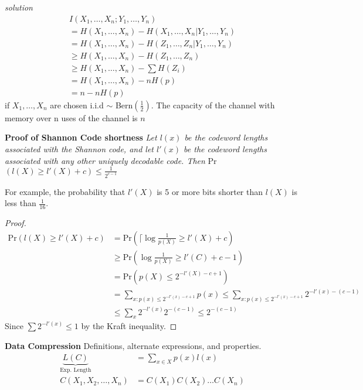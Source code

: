 \documentclass[10pt]{article}
\begin{document}
\begin{tiny}
\begin{multicols}{3}
{\it solution} 
\begin{eqnarray*}
I(X_{1},\ldots,X_{n};Y_{1},\ldots,Y_{n})\\
= H(X_{1},\ldots,X_{n})-H(X_{1},\ldots,X_{n}|Y_{1},\ldots,Y_{n})\\
= H(X_{1},\ldots,X_{n}) - H(Z_{1},\ldots,Z_{n}|Y_{1},\ldots,Y_{n})\\
\geq H(X_{1},\ldots,X_{n}) - H(Z_{1},\ldots,Z_{n})\\
\geq H(X_{1},\ldots,X_{n}) - \sum H(Z_{i})\\
=H(X_{1},\ldots,X_{n}) - nH(p)\\
=n - nH(p)
\end{eqnarray*}
if $X_{1},\ldots,X_{n}$ are chosen i.i.d $\sim$ Bern$\left( \frac{1}{2}\right)$. The capacity of the channel with memory over n uses of the channel is $n$


\textbf{\scriptsize Proof of Shannon Code shortness}
{\it Let $l(x)$ be the codeword lengths associated with the Shannon code, and let $l'(x)$ be the codeword lengths associated with any other uniquely decodable code. Then} Pr$(l(X) \geq l'(X) + c)\leq \frac{1}{2^{c-1}}$

For example, the probability that $l'(X)$ is 5 or more bits shorter than $l(X)$ is less than $\frac{1}{16}$. 

\begin{proof}
\begin{align*}
\text{Pr}(l(X) \geq l'(X) + c)
&= \text{Pr}\left(\lceil \log \frac{1}{p(X)} \geq l'(X) + c \right) \\
&\geq \text{Pr}\left( \log \frac{1}{p(X)} \geq l'(C) + c - 1 \right)\\
&=\text{Pr}\left( p(X) \leq 2^{-l'(X)-c+1}\right) \\
&=\sum_{x:p(x)\leq 2^{-l'(x)-c+1}} p(x)
\leq \sum_{x:p(x)\leq 2^{-l'(x)-c+1}}2^{-l'(x)-(c-1)} \\
&\leq \sum_{x}2^{-l'(x)}2^{-(c-1)}
\leq 2^{-(c-1)} 
\end{align*}
Since $\sum 2^{-l'(x)} \leq 1$ by the Kraft inequality.
\end{proof}

\textbf{\scriptsize Data Compression}
Definitions, alternate expressions, and properties.
\begin{align}
    \underbrace{L(C)}_\text{Exp. Length}&= \sum_{x\in X} p(x)l(x) \label{defn: Exp. Length}\\
C(X_1,X_2,\ldots,X_n) &= C(X_1)C(X_2)\ldots C(X_n)
\end{align}


\end{multicols}
\end{tiny}
\end{document}
